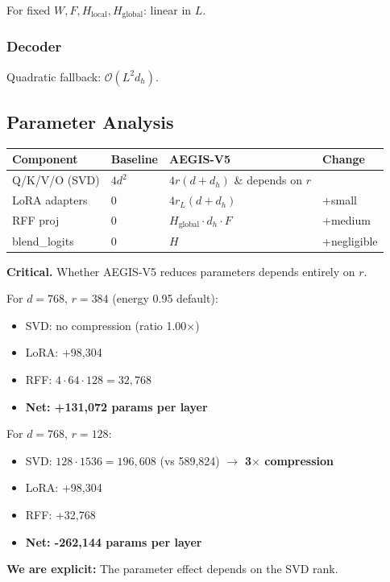 For fixed $W, F, H_\text{local}, H_\text{global}$: linear in $L$.

\subsubsection{Decoder}

Quadratic fallback: $\mathcal{O}(L^2 d_h)$.

\subsection{Parameter Analysis}

\begin{table}[H]
\centering
\small
\begin{tabular}{llll}
\toprule
\textbf{Component} & \textbf{Baseline} & \textbf{AEGIS-V5} & \textbf{Change} \\
\midrule
Q/K/V/O (SVD) & $4 d^2$ & $4 r(d + d_h)$ \& depends on $r$ \\
LoRA adapters & 0 & $4 r_L (d + d_h)$ & +small \\
RFF proj & 0 & $H_\text{global} \cdot d_h \cdot F$ & +medium \\
blend\_logits & 0 & $H$ & +negligible \\
\bottomrule
\end{tabular}
\end{table}

\textbf{Critical.} Whether AEGIS-V5 reduces parameters depends entirely on $r$.

For $d = 768$, $r = 384$ (energy 0.95 default):
\begin{itemize}
\item SVD: no compression (ratio 1.00$\times$)
\item LoRA: +98,304
\item RFF: $4 \cdot 64 \cdot 128 = 32,768$
\item \textbf{Net: +131,072 params per layer}

\end{itemize}
For $d = 768$, $r = 128$:
\begin{itemize}
\item SVD: $128 \cdot 1536 = 196,608$ (vs 589,824) $\to$ \textbf{3$\times$ compression}
\item LoRA: +98,304
\item RFF: +32,768
\item \textbf{Net: -262,144 params per layer}

\end{itemize}
\textbf{We are explicit:} The parameter effect depends on the SVD rank.

